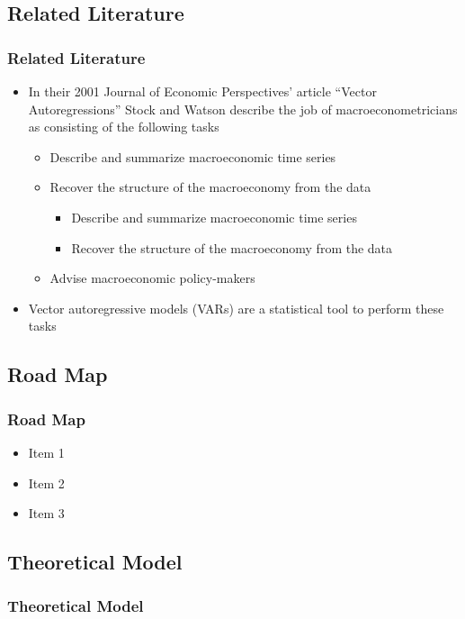 \documentclass[11pt]{beamer}
\begin{document}
\begin{frame}
	\section{Related Literature}
	\frametitle{\bfseries Related Literature}
	
	\begin{itemize}
		\item In their 2001 Journal of Economic Perspectives' article ``Vector Autoregressions'' Stock and
		Watson describe the job of macroeconometricians as consisting of the following tasks
		\begin{itemize}
			\item Describe and summarize macroeconomic time series
			\item Recover the structure of the macroeconomy from the data
			\begin{itemize}
				\item Describe and summarize macroeconomic time series
				\item Recover the structure of the macroeconomy from the data
			\end{itemize}
			\item Advise macroeconomic policy-makers
		\end{itemize}
		\item Vector autoregressive models (VARs) are a statistical tool to perform these tasks

	\end{itemize}
\end{frame}

\begin{frame}
	\section{Road Map}
	\frametitle{\bfseries Road Map}
	
	\begin{itemize}
		\item Item 1
		\item Item 2
		\item Item 3
	\end{itemize}
\end{frame}

\begin{frame}
	\section{Theoretical Model}
	\frametitle{\bfseries Theoretical Model}
\end{frame}
\end{document}
